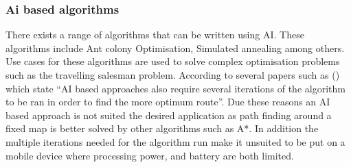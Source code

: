 \subsubsection{Ai based algorithms}
There exists a range of algorithms that can be written using AI. These algorithms include Ant colony Optimisation, Simulated annealing among others. Use cases for these algorithms are used to solve complex optimisation problems such as the travelling salesman problem. According to several papers such as (\citetemp \citetemp) which state “AI based approaches also require several iterations of the algorithm to be ran in order to find the more optimum route”. Due these reasons an AI based approach is not suited the desired application as path finding around a fixed map is better solved by other algorithms such as A*. In addition the multiple iterations needed for the algorithm run make it unsuited to be put on a mobile device where processing power, and battery are both limited.  